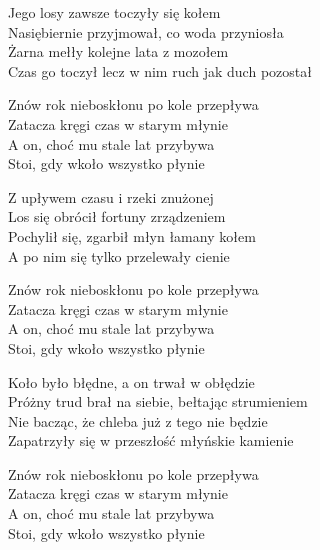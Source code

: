 \begin{text}
Jego losy zawsze toczyły się kołem\\
Nasiębiernie przyjmował, co woda przyniosła\\
Żarna mełły kolejne lata z mozołem\\
Czas go toczył lecz w nim ruch jak duch pozostał

Znów rok nieboskłonu po kole przepływa\\
Zatacza kręgi czas w starym młynie\\
A on, choć mu stale lat przybywa\\
Stoi, gdy wkoło wszystko płynie

Z upływem czasu i rzeki znużonej\\
Los się obrócił fortuny zrządzeniem\\
Pochylił się, zgarbił młyn łamany kołem\\
A po nim się tylko przelewały cienie

Znów rok nieboskłonu po kole przepływa\\
Zatacza kręgi czas w starym młynie\\
A on, choć mu stale lat przybywa\\
Stoi, gdy wkoło wszystko płynie

Koło było błędne, a on trwał w obłędzie\\
Próżny trud brał na siebie, bełtając strumieniem\\
Nie bacząc, że chleba już z tego nie będzie\\
Zapatrzyły się w przeszłość młyńskie kamienie

Znów rok nieboskłonu po kole przepływa\\
Zatacza kręgi czas w starym młynie\\
A on, choć mu stale lat przybywa\\
Stoi, gdy wkoło wszystko płynie
\end{text}
\begin{chord}
\end{chord}